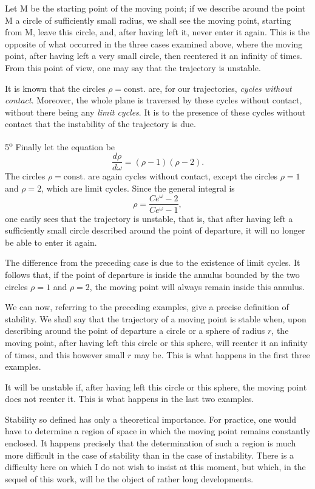 \documentclass[11pt]{article}
\begin{document}
Let M be the starting point of the moving point; if we describe around the point M a circle of sufficiently small radius, we shall see the moving point, starting from M, leave this circle, and, after having left it, never enter it again. This is the opposite of what occurred in the three cases examined above, where the moving point, after having left a very small circle, then reentered it an infinity of times. From this point of view, one may say that the trajectory is unstable.

It is known that the circles $\rho=\mathrm{const.}$ are, for our trajectories, \emph{cycles without contact}. Moreover, the whole plane is traversed by these cycles without contact, without there being any \emph{limit cycles}. It is to the presence of these cycles without contact that the instability of the trajectory is due.

5\textsuperscript{o} Finally let the equation be
\[
\frac{d\rho}{d\omega}=(\rho-1)(\rho-2).
\]
The circles $\rho=\mathrm{const.}$ are again cycles without contact, except the circles $\rho=1$ and $\rho=2$, which are limit cycles. Since the general integral is
\[
\rho=\frac{Ce^\omega-2}{Ce^\omega-1},
\]
one easily sees that the trajectory is unstable, that is, that after having left a sufficiently small circle described around the point of departure, it will no longer be able to enter it again.

The difference from the preceding case is due to the existence of limit cycles. It follows that, if the point of departure is inside the annulus bounded by the two circles $\rho=1$ and $\rho=2$, the moving point will always remain inside this annulus.

We can now, referring to the preceding examples, give a precise definition of stability. We shall say that the trajectory of a moving point is stable when, upon describing around the point of departure a circle or a sphere of radius $r$, the moving point, after having left this circle or this sphere, will reenter it an infinity of times, and this however small $r$ may be. This is what happens in the first three examples.

It will be unstable if, after having left this circle or this sphere, the moving point does not reenter it. This is what happens in the last two examples.

Stability so defined has only a theoretical importance. For practice, one would have to determine a region of space in which the moving point remains constantly enclosed. It happens precisely that the determination of such a region is much more difficult in the case of stability than in the case of instability. There is a difficulty here on which I do not wish to insist at this moment, but which, in the sequel of this work, will be the object of rather long developments.
\end{document}
